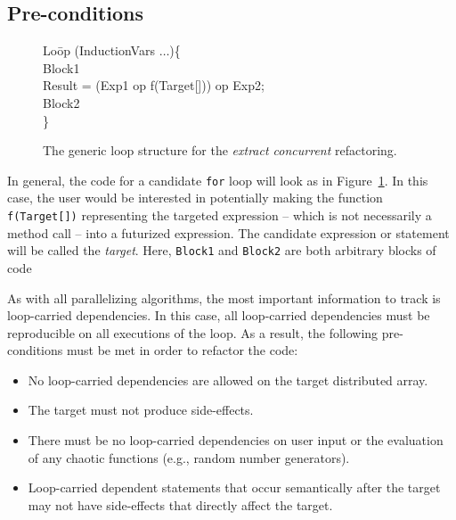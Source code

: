 \subsection{Pre-conditions}

\begin{figure}[tp]
\begin{code}
Lo\=op (InductionVars $\ldots$)\{ \\
\> Block1 \\
\> Result = (Exp1 op f(Target[])) op Exp2; \\
\> Block2 \\
\}
\end{code}
\caption{\label{fig:basic_loop}The generic loop structure for the {\it
extract concurrent} refactoring.}
\end{figure}

In general, the code for a candidate {\tt for} loop will look as in
Figure~\ref{fig:basic_loop}. In this case, the user would be
interested in potentially making the function {\tt f(Target[])} representing
the targeted expression -- which is not
necessarily a method call -- into a futurized expression. The
candidate expression or statement will be called the {\em target}. Here,
{\tt Block1} and {\tt Block2} are both arbitrary blocks of
code%

As with all parallelizing algorithms, the most important information to
track is loop-carried dependencies. In this case, all loop-carried dependencies
must be reproducible on all executions of the loop. As a result, the following
pre-conditions must be met in order to refactor the code:
\begin{itemize}
\item No loop-carried dependencies are allowed on the target distributed array.
\item The target must not produce side-effects.
\item There must be no loop-carried dependencies on user input or the
      evaluation of any chaotic functions (e.g., random number generators).
\item Loop-carried dependent statements that occur semantically after the
target may not have side-effects that directly affect the target.
\end{itemize}

